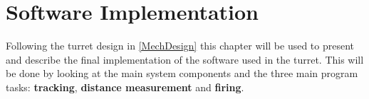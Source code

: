 \chapter{Software Implementation}\label{ImplLabel}
Following the turret design in \autoref{MechDesign} this chapter will be used to present and
describe the final implementation of the software used in the \name turret. This will be done
by looking at the main system components and the three main program tasks:
\textbf{tracking}, \textbf{distance measurement} and \textbf{firing}.


%






% 
